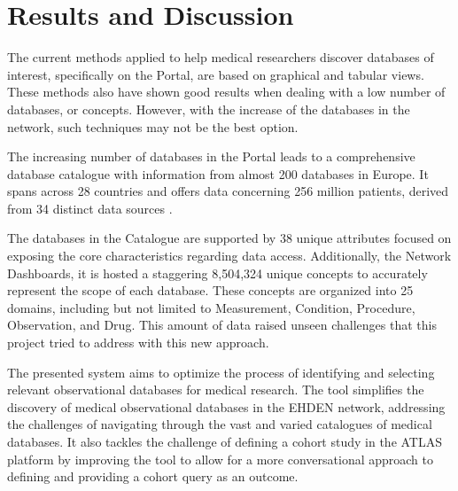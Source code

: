\chapter{Results and Discussion}
\label{chapter:RD}



The current methods applied to help medical researchers discover databases of interest, specifically on the {\ehden} Portal, are based on graphical and tabular views. These methods also have shown good results when dealing with a low number of databases, or concepts. However, with the increase of the databases in the network, such techniques may not be the best option.

The increasing number of databases in the {\ehden} Portal leads to a comprehensive database catalogue with information from almost 200 databases in Europe. It spans across 28 countries and offers data concerning 256 million patients, derived from 34 distinct data sources \cite{reis2024chatbotlike}. 

The databases in the {\ehden} Catalogue are supported by 38 unique attributes focused on exposing the core characteristics regarding data access. Additionally, the {\ehden} Network Dashboards, it is hosted a staggering 8,504,324 unique concepts to accurately represent the scope of each database. These concepts are organized into 25 domains, including but not limited to Measurement, Condition, Procedure, Observation, and Drug. This amount of data raised unseen challenges that this project tried to address with this new approach.

The presented system aims to optimize the process of identifying and selecting relevant observational databases for medical research. The tool simplifies the discovery of medical observational databases in the EHDEN network, addressing the challenges of navigating through the vast and varied catalogues of medical databases. It also tackles the challenge of defining a cohort study in the ATLAS platform by improving the tool to allow for a more conversational approach to defining and providing a cohort query as an outcome.


